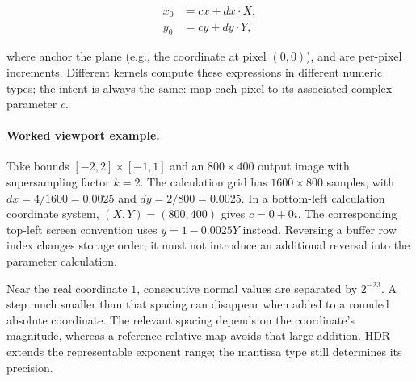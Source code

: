 \begin{align}
x_0 &= cx + dx \cdot X, \\
y_0 &= cy + dy \cdot Y,
\end{align}

where  anchor the plane (e.g., the coordinate at pixel \((0,0)\)),
and  are per-pixel increments. Different kernels compute these
expressions in different numeric types; the intent is always the same: map each
pixel to its associated complex parameter \(c\).

\paragraph{Worked viewport example.}
Take bounds $[-2,2]\times[-1,1]$ and an $800\times400$ output image with
supersampling factor $k=2$. The calculation grid has $1600\times800$ samples, with
$dx=4/1600=0.0025$ and $dy=2/800=0.0025$. In a bottom-left calculation coordinate
system, $(X,Y)=(800,400)$ gives $c=0+0i$. The corresponding top-left screen convention
uses $y=1-0.0025Y$ instead. Reversing a buffer row index changes storage order; it
must not introduce an additional reversal into the parameter calculation.

Near the real coordinate $1$, consecutive normal  values are separated
by $2^{-23}$. A step much smaller than that spacing can disappear when added to a
rounded absolute coordinate. The relevant spacing depends on the coordinate's
magnitude, whereas a reference-relative map avoids that large addition. HDR extends
the representable exponent range; the mantissa type still determines its precision.
